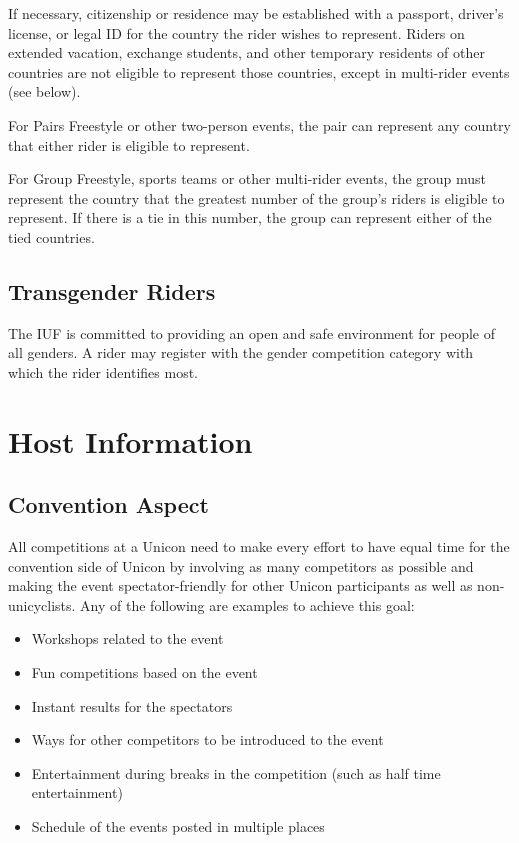 If necessary, citizenship or residence may be established with a passport, driver's license, or legal ID for the country the rider wishes to represent.
Riders on extended vacation, exchange students, and other temporary residents of other countries are not eligible to represent those countries, except in multi-rider events (see below).

For Pairs Freestyle or other two-person events, the pair can represent any country that either rider is eligible to represent.

For Group Freestyle, sports teams or other multi-rider events, the group must represent the country that the greatest number of the group's riders is eligible to represent.
If there is a tie in this number, the group can represent either of the tied countries.

\section{Transgender Riders}
The IUF is committed to providing an open and safe environment for people of all genders.
A rider may register with the gender competition category with which the rider identifies most.

\chapter{Host Information}

\section{Convention Aspect}

All competitions at a Unicon need to make every effort to have equal time for the convention side of Unicon by involving as many competitors as possible and making the event spectator-friendly for other Unicon participants as well as non-unicyclists.
Any of the following are examples to achieve this goal:
\begin{itemize}
  \item Workshops related to the event
  \item Fun competitions based on the event
  \item Instant results for the spectators
  \item Ways for other competitors to be introduced to the event
  \item Entertainment during breaks in the competition (such as half time entertainment)
  \item Schedule of the events posted in multiple places
\end{itemize}

